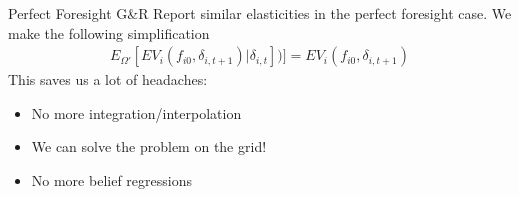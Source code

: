 \documentclass[xcolor=pdftex,dvipsnames,table,mathserif,aspectratio=169]{beamer}
\begin{document}
\begin{frame}{Perfect Foresight}
G\&R Report similar elasticities in the perfect foresight case. We make the following simplification
\begin{eqnarray*}
E_{\Omega'}[ EV_i (f_{i0}, \delta_{i,t+1}) |\delta_{i,t}] )] = EV_i (f_{i0}, \delta_{i,t+1})
\end{eqnarray*}
This saves us a lot of headaches:
\begin{itemize}
\item No more integration/interpolation
\item We can solve the problem on the grid!
\item No more belief regressions
\end{itemize}
\end{frame}
%
%
%
\end{document}
